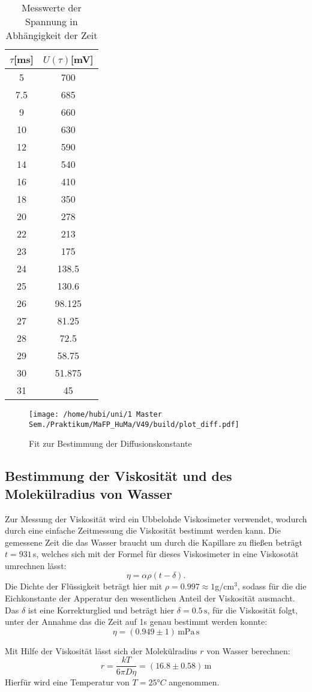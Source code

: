 \begin{table}
  \centering
  \caption{Messwerte der Spannung in Abhängigkeit der Zeit}
  \label{tabmess1}
  \begin{tabular}{c|c}
    \toprule
    $\tau$[ms] & $U(\tau)$[mV]\\
    \midrule
5&   700\\
7.5& 685\\
9  & 660\\
10 & 630\\
12 & 590\\
14 & 540\\
16 & 410\\
18 & 350\\
20 & 278\\
22 & 213\\
23 & 175\\
24 & 138.5\\
25 & 130.6\\
26 & 98.125\\
27 & 81.25\\
28 & 72.5\\
29 & 58.75\\
30 & 51.875\\
31 & 45     \\

\bottomrule
\end{tabular}
\end{table}

\begin{figure}[h]
\centering
\texttt{[image: /home/hubi/uni/1 Master Sem./Praktikum/MaFP\_HuMa/V49/build/plot\_diff.pdf]}
\caption{Fit zur Bestimmung der Diffusionskonstante}
\label{fitd}
\end{figure}

\subsection{Bestimmung der Viskosität und des Molekülradius von Wasser}
Zur Messung der Viskosität wird ein Ubbelohde Viskosimeter verwendet,
wodurch durch eine einfache Zeitmessung die Viskosität bestimmt werden kann.
Die gemessene Zeit die das Wasser braucht um durch die
Kapillare zu fließen beträgt $t=931\,$s, welches sich mit der Formel für
dieses Viskosimeter in eine Viskosotät umrechnen lässt:
$$ \eta=\alpha \rho (t- \delta).$$
Die Dichte der Flüssigkeit beträgt hier mit $\rho=0.997\approx 1$g$/$c$\text{m}^3$,
sodass für die die Eichkonstante der Apperatur den wesentlichen Anteil
der Viskosität ausmacht. Das $\delta$ ist eine Korrekturglied und beträgt hier
$\delta=0.5\, \text{s}$, für die Viskosität folgt, unter der Annahme das die Zeit auf
1s genau bestimmt werden konnte:
$$\eta=(0.949 \pm1)\,\text{mPa}\,\text{s} $$

Mit Hilfe der Viskosität lässt sich der Molekülradius $r$ von  Wasser berechnen:
$$r=\frac{kT}{6 \pi D \eta}=(16.8\pm 0.58)\, \text{m}$$
Hierfür wird eine Temperatur von $T=25°C$ angenommen.
